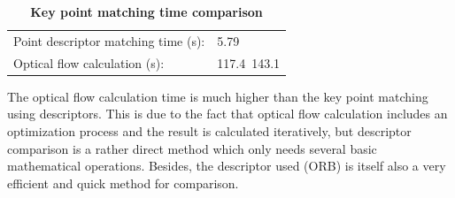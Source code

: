 \documentclass[11pt]{easychair}
\begin{document}
\begin{table}
	\centering
	\caption{\textbf{Key point matching time comparison}}
	\label{tab:matching}
	\begin{tabular}{ll}
		Point descriptor matching time (s): &5.79\\
		Optical flow calculation (s): & 117.4~143.1   \\              
	\end{tabular}
\end{table}

The optical flow calculation time is much higher than the key point matching using descriptors. This is due to the fact that optical flow calculation includes an optimization process and the result is calculated iteratively, but descriptor comparison is a rather direct method which only needs several basic mathematical operations. Besides, the descriptor used (ORB) is itself also a very efficient and quick method for comparison.
\end{document}
